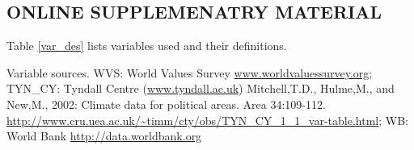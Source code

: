 \documentclass[10pt, letterpaper]{article}
\begin{document}
\begin{spacing}{1.4}








\newpage
\section{ONLINE SUPPLEMENATRY MATERIAL}

Table
\ref{var_des} lists variables used and their definitions.



{\scriptsize \noindent Variable sources. WVS: World Values Survey \url{www.worldvaluessurvey.org};
TYN\_CY: Tyndall Centre (\url{www.tyndall.ac.uk}) Mitchell,T.D., Hulme,M., and
New,M., 2002: Climate data for political areas. Area
34:109-112. \url{http://www.cru.uea.ac.uk/~timm/cty/obs/TYN_CY_1_1_var-table.html};
WB: World Bank \url{http://data.worldbank.org}}





\end{spacing}
\end{document}

